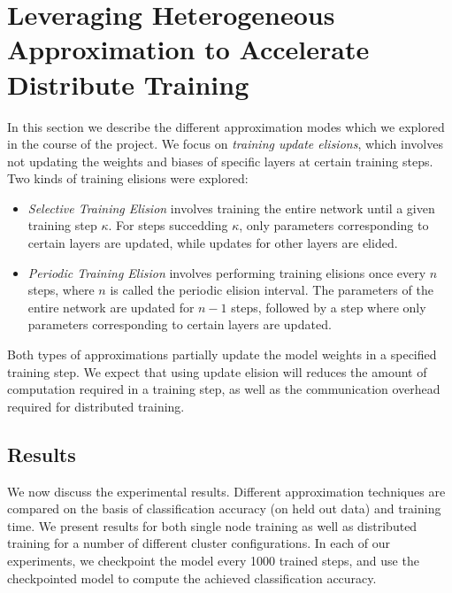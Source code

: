 \section{Leveraging Heterogeneous Approximation to Accelerate Distribute Training}
In this section we describe the different approximation modes which we explored in the course of the project. We focus on \textit{training update elisions}, which involves not updating the weights and biases of specific layers at certain training steps. Two kinds of training elisions were explored:
\begin{itemize}
	\item \textit{Selective Training Elision} involves training the entire network until a given training step $\kappa$. For steps succedding $\kappa$, only parameters corresponding to certain layers are updated, while updates for other layers are elided.
	\item \textit{Periodic Training Elision} involves performing training elisions once every $n$ steps, where $n$ is called the periodic elision interval. The parameters of the entire network are updated for $n-1$ steps, followed by a step where only parameters corresponding to certain layers are updated.
\end{itemize}

Both types of approximations partially update the model weights in a specified training step. We expect that using update elision will  reduces the amount of computation required in a training step, as well as the communication overhead required for distributed training. 

\subsection{Results}
We now discuss the experimental results. Different approximation techniques are compared on the basis of classification accuracy (on held out data) and training time. We present results for both single node training as well as distributed training for a number of different cluster configurations. In each of our experiments, we checkpoint the model every 1000 trained steps, and use the checkpointed model to compute the achieved classification accuracy.

